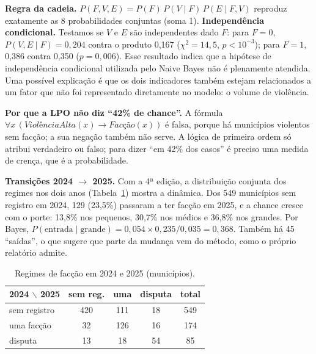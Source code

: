 \documentclass[10pt,a4paper,twocolumn]{article}
\begin{document}
\textbf{Regra da cadeia.} $P(F,V,E)=P(F)\,P(V\mid F)\,P(E\mid F,V)$ reproduz exatamente as 8
probabilidades conjuntas (soma 1). \textbf{Independência condicional.} Testamos se $V$ e $E$ são
independentes dado $F$: para $F=0$, $P(V,E\mid F)=0{,}204$ contra o produto 0,167 ($\chi^2=14{,}5$,
$p<10^{-3}$); para $F=1$, 0,386 contra 0,350 ($p=0{,}006$). Esse resultado indica que a hipótese de independência condicional utilizada pelo Naive Bayes não é plenamente atendida. Uma possível explicação é que os dois indicadores também estejam relacionados a um fator que não foi representado diretamente no modelo: o volume de violência.

\textbf{Por que a LPO não diz ``42\% de chance''.} A fórmula
$\forall x\,(\mathit{ViolênciaAlta}(x)\rightarrow\mathit{Facção}(x))$ é falsa, porque há municípios
violentos sem facção; a sua negação também não serve. A lógica de primeira ordem só atribui
verdadeiro ou falso; para dizer ``em 42\% dos casos'' é preciso uma medida de crença, que é a
probabilidade.

\textbf{Transições 2024 $\to$ 2025.} Com a 4ª edição, a distribuição conjunta dos regimes nos dois
anos (Tabela~\ref{tab:trans}) mostra a dinâmica. Dos 549 municípios sem registro em 2024, 129
(23,5\%) passaram a ter facção em 2025, e a chance cresce com o porte: 13,8\% nos pequenos, 30,7\%
nos médios e 36,8\% nos grandes. Por Bayes,
$P(\text{entrada}\mid\text{grande}) = 0{,}054\times0{,}235/0{,}035 = 0{,}368$.
Também há 45 ``saídas'', o que sugere que parte da mudança vem do método, como o próprio
relatório admite.

\begin{table}[H]\centering\small
\begin{tabular}{lcccc}\toprule
2024 $\backslash$ 2025 & sem reg. & uma & disputa & total\\\midrule
sem registro & 420 & 111 & 18 & 549\\
uma facção & 32 & 126 & 16 & 174\\
disputa & 13 & 18 & 54 & 85\\\bottomrule
\end{tabular}\caption{Regimes de facção em 2024 e 2025 (municípios).}\label{tab:trans}\end{table}
\end{document}

